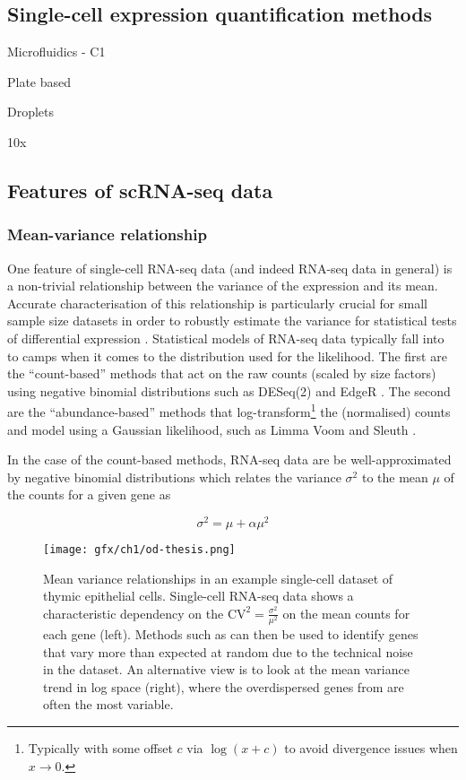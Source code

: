 \subsection{Single-cell expression quantification methods}

Microfluidics - C1

Plate based

Droplets

10x

\subsection{Features of scRNA-seq data}

\subsubsection{Mean-variance relationship}

One feature of single-cell RNA-seq data (and indeed RNA-seq data in general) is a non-trivial relationship between the variance of the expression and its mean. Accurate characterisation of this relationship is particularly crucial for small sample size datasets in order to robustly estimate the variance for statistical tests of differential expression \cite{Robinson2010-rj}. Statistical models of RNA-seq data typically fall into to camps when it comes to the distribution used for the likelihood. The first are the ``count-based'' methods  that act on the raw counts (scaled by size factors) using negative binomial distributions such as DESeq(2) and EdgeR \cite{Anders2010,Robinson2010-rj}. The second are the ``abundance-based'' methods  that log-transform\footnote{
Typically with some offset $c$ via $\log(x+c)$ to avoid divergence issues when $x \rightarrow 0$.
} the (normalised) counts and model using a Gaussian likelihood, such as Limma Voom and Sleuth \cite{Law2014-tu,Pimentel2016-xz}.

In the case of the count-based methods, RNA-seq data are  be well-approximated by negative binomial distributions \cite{Anders2010,Robinson2010-rj,Risso2017-qk} which relates the variance $\sigma^2$ to the mean $\mu$ of the counts for a given gene as

\begin{equation}
  \sigma^2 = \mu + \alpha \mu^2
\end{equation}

\begin{figure}
\centering
  \texttt{[image: gfx/ch1/od-thesis.png]}
  \caption{Mean variance relationships in an example single-cell dataset of thymic epithelial cells. Single-cell RNA-seq data shows a characteristic dependency on the $\text{CV}^2 = \frac{\sigma^2}
{\mu^2}$ on the mean counts for each gene (left). Methods such as \cite{Brennecke2013-xy} can then be used to identify genes that vary more than expected at random due to the technical noise in the dataset. An alternative view is to look at the mean variance trend in log space (right), where the overdispersed genes from \cite{Brennecke2013-xy} are often the most variable.} \label{fig:od}
\end{figure}

